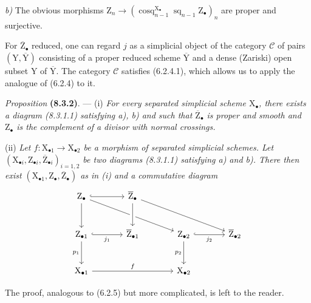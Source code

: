 \documentclass[11pt,leqno]{article}
\begin{document}
\textit{b)} The obvious morphisms \(\mathrm{Z}_n\to(\operatorname{cosq}_{n-1}^{\mathrm{X}_\bullet}\operatorname{sq}_{n-1}\mathrm{Z}_\bullet)_n\) are proper and surjective.

For \(\overline{\mathrm{Z}}_\bullet\) reduced, one can regard \(j\) as a simplicial object of the category \(\mathcal{C}\) of pairs \((\mathrm{Y},\overline{\mathrm{Y}})\) consisting of a proper reduced scheme \(\overline{\mathrm{Y}}\) and a dense (Zariski) open subset \(\mathrm{Y}\) of \(\overline{\mathrm{Y}}\). The category \(\mathcal{C}\) satisfies (6.2.4.1), which allows us to apply the analogue of (6.2.4) to it.

\textit{Proposition} \textbf{(8.3.2)}. — (i) \textit{For every separated simplicial scheme \(\mathrm{X}_\bullet\), there exists a diagram \textup{(8.3.1.1)} satisfying a), b) and such that \(\overline{\mathrm{Z}}_\bullet\) is proper and smooth and \(\mathrm{Z}_\bullet\) is the complement of a divisor with normal crossings.}

(ii) \textit{Let  \(f:\mathrm{X}_{\bullet1}\to\mathrm{X}_{\bullet2}\) be a morphism of separated simplicial schemes. Let \((\mathrm{X}_{\bullet i},\mathrm{Z}_{\bullet i},\overline{\mathrm{Z}}_{\bullet i})_{i=1,2}\) be two diagrams \textup{(8.3.1.1)} satisfying a) and b). There then exist \((\mathrm{X}_{\bullet1},\mathrm{Z}_\bullet,\overline{\mathrm{Z}}_\bullet)\) as in \textup{(i)} and a commutative diagram}
\[
\begin{tikzcd}[column sep=large,row sep=large]
\mathrm{Z}_\bullet
  \arrow[r,hook] \arrow[d] \arrow[drr]
 & \overline{\mathrm{Z}}_\bullet
   \arrow[d,crossing over] \arrow[drr]
 & &\\
\mathrm{Z}_{\bullet1}
  \arrow[r,hook,"j_1"'] \arrow[d,"p_1"']
 & \overline{\mathrm{Z}}_{\bullet1}
 & \mathrm{Z}_{\bullet2}
   \arrow[r,hook,"j_2"'] \arrow[d,"p_2"']
 & \overline{\mathrm{Z}}_{\bullet2}\\
\mathrm{X}_{\bullet1} \arrow[rr,"f"]
 & & \mathrm{X}_{\bullet2} &
\end{tikzcd}
\]

The proof, analogous to (6.2.5) but more complicated, is left to the reader.
\end{document}
